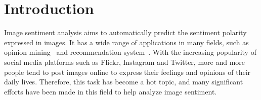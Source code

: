 \section{Introduction}

Image sentiment analysis aims to automatically predict the sentiment polarity expressed in images. It has a wide range of applications in many fields, such as opinion mining~\cite{al2024comprehensive} and recommendation system~\cite{zhan2023analyzing}. 
With the increasing popularity of social media platforms such as Flickr, Instagram and Twitter, more and more people tend to post images online to express their feelings and opinions of their daily lives. 
Therefore, this task has become a hot topic, and many significant efforts have been made in this field to help analyze image sentiment.

